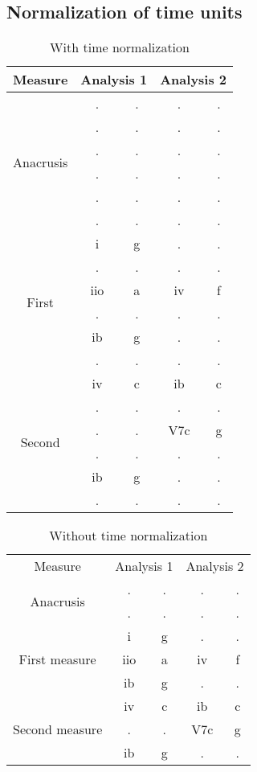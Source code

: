   \subsection{Normalization of time units}
	\begin{table}[]
	\centering
	\begin{tabular}{|c|c|c|c|c|}
	\hline
	Measure & \multicolumn{2}{c|}{Analysis 1} & \multicolumn{2}{c|}{Analysis 2} \\ \hline
	\multirow{6}{*}{Anacrusis} & . & . & . & . \\ \cline{2-5}
	 & . & . & . & . \\ \cline{2-5}
	 & . & . & . & . \\ \cline{2-5}
	 & . & . & . & . \\ \cline{2-5}
	 & . & . & . & . \\ \cline{2-5}
	 & . & . & . & . \\ \hline
	\multirow{6}{*}{First} & i & g & . & . \\ \cline{2-5}
	 & . & . & . & . \\ \cline{2-5}
	 & iio & a & iv & f \\ \cline{2-5}
	 & . & . & . & . \\ \cline{2-5}
	 & ib & g & . & . \\ \cline{2-5}
	 & . & . & . & . \\ \hline
	\multirow{6}{*}{Second} & iv & c & ib & c \\ \cline{2-5}
	 & . & . & . & . \\ \cline{2-5}
	 & . & . & V7c & g \\ \cline{2-5}
	 & . & . & . & . \\ \cline{2-5}
	 & ib & g & . & . \\ \cline{2-5}
	 & . & . & . & . \\ \hline
	\end{tabular}
	\caption{With time normalization}
	\label{my-label}
	\end{table}


	\begin{table}[]
	\centering
	\begin{tabular}{ccccc}
	Measure & \multicolumn{2}{c}{Analysis 1} & \multicolumn{2}{c}{Analysis 2} \\
	\multirow{2}{*}{Anacrusis} & . & . & . & . \\
	 & . & . & . & . \\
	\multirow{3}{*}{First measure} & i & g & . & . \\
	 & iio & a & iv & f \\
	 & ib & g & . & . \\
	\multirow{3}{*}{Second measure} & iv & c & ib & c \\
	 & . & . & V7c & g \\
	 & ib & g & . & .
	\end{tabular}
	\caption{Without time normalization}
	\label{my-label}
	\end{table}

